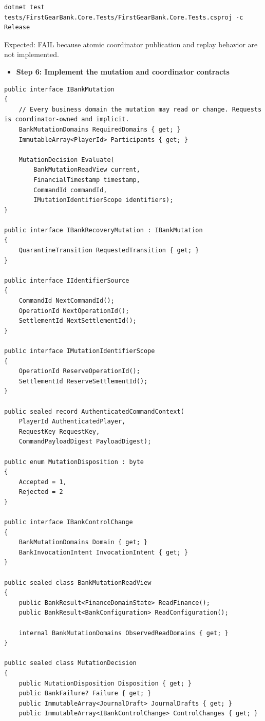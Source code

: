 \documentclass[
  10pt,
  letterpaper,
]{article}
\providecommand{\tightlist}{%
  \setlength{\itemsep}{0pt}\setlength{\parskip}{0pt}}
\begin{document}
\begin{lstlisting}
dotnet test tests/FirstGearBank.Core.Tests/FirstGearBank.Core.Tests.csproj -c Release
\end{lstlisting}

Expected: FAIL because atomic coordinator publication and replay
behavior are not implemented.

\begin{itemize}
\tightlist
\item[$\square$]
  \textbf{Step 6: Implement the mutation and coordinator contracts}
\end{itemize}

\begin{lstlisting}
public interface IBankMutation
{
    // Every business domain the mutation may read or change. Requests is coordinator-owned and implicit.
    BankMutationDomains RequiredDomains { get; }
    ImmutableArray<PlayerId> Participants { get; }

    MutationDecision Evaluate(
        BankMutationReadView current,
        FinancialTimestamp timestamp,
        CommandId commandId,
        IMutationIdentifierScope identifiers);
}

public interface IBankRecoveryMutation : IBankMutation
{
    QuarantineTransition RequestedTransition { get; }
}

public interface IIdentifierSource
{
    CommandId NextCommandId();
    OperationId NextOperationId();
    SettlementId NextSettlementId();
}

public interface IMutationIdentifierScope
{
    OperationId ReserveOperationId();
    SettlementId ReserveSettlementId();
}

public sealed record AuthenticatedCommandContext(
    PlayerId AuthenticatedPlayer,
    RequestKey RequestKey,
    CommandPayloadDigest PayloadDigest);

public enum MutationDisposition : byte
{
    Accepted = 1,
    Rejected = 2
}

public interface IBankControlChange
{
    BankMutationDomains Domain { get; }
    BankInvocationIntent InvocationIntent { get; }
}

public sealed class BankMutationReadView
{
    public BankResult<FinanceDomainState> ReadFinance();
    public BankResult<BankConfiguration> ReadConfiguration();

    internal BankMutationDomains ObservedReadDomains { get; }
}

public sealed class MutationDecision
{
    public MutationDisposition Disposition { get; }
    public BankFailure? Failure { get; }
    public ImmutableArray<JournalDraft> JournalDrafts { get; }
    public ImmutableArray<IBankControlChange> ControlChanges { get; }


\end{lstlisting}
\end{document}
